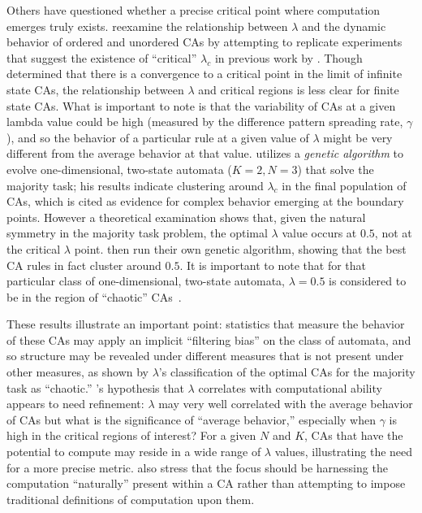 \documentclass[a4paper,11pt]{report}
\begin{document}
Others have questioned whether a precise critical point where computation emerges truly exists. \citeauthor{mi93} reexamine the relationship between $\lambda$ and the dynamic behavior of ordered and unordered CAs by attempting to replicate experiments that suggest the existence of ``critical'' $\lambda_c$ in previous work by \citeauthor{pa88}. Though \citeauthor{wo90} determined that there is a convergence to a critical point in the limit of infinite state CAs, the relationship between $\lambda$ and critical regions is less clear for finite state CAs. What is important to note is that the variability of CAs at a given lambda value could be high (measured by the difference pattern spreading rate, $\gamma$), and so the behavior of a particular rule at a given value of $\lambda$ might be very different from the average behavior at that value. \citeauthor{pa88} utilizes a \textit{genetic algorithm} to evolve one-dimensional, two-state automata ($K=2, N=3$) that solve the majority task; his results indicate clustering around $\lambda_c$ in the final population of CAs, which is cited as evidence for complex behavior emerging at the boundary points. However a theoretical examination shows that, given the natural symmetry in the majority task problem, the optimal $\lambda$ value occurs at $0.5$, not at the critical $\lambda$ point. \citeauthor{mi93} then run their own genetic algorithm, showing that the best CA rules in fact cluster around $0.5$. It is important to note that for that particular class of one-dimensional, two-state automata, $\lambda = 0.5$ is considered to be in the region of ``chaotic'' CAs~\cite{mi93}. 

These results illustrate an important point: statistics that measure the behavior of these CAs may apply an implicit ``filtering bias'' on the class of automata, and so structure may be revealed under different measures that is not present under other measures, as shown by $\lambda$'s classification of the optimal CAs for the majority task as ``chaotic.'' \citeauthor{la90}'s hypothesis that $\lambda$ correlates with computational ability appears to need refinement: $\lambda$ may very well correlated with the average behavior of CAs but what is the significance of  ``average behavior,''  especially when $\gamma$ is high in the critical regions of interest? For a given $N$ and $K$, CAs that have the potential to compute may reside in a wide range of $\lambda$ values, illustrating the need for a more precise metric. \citeauthor{mi93} also stress that the focus should be harnessing the computation ``naturally'' present within a CA rather than attempting to impose traditional definitions of computation upon them. 
\end{document}
